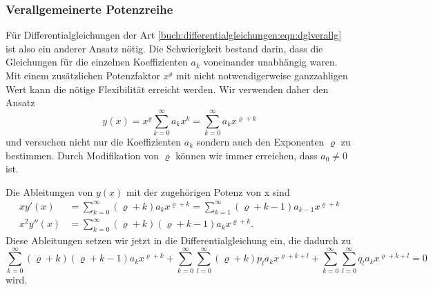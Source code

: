 \subsubsection{Verallgemeinerte Potenzreihe}
Für Differentialgleichungen der Art
\eqref{buch:differentialgleichungen:eqn:dglverallg}
ist also ein anderer Ansatz nötig.
Die Schwierigkeit bestand darin, dass die Gleichungen für die einzelnen
Koeffizienten $a_k$ voneinander unabhängig waren.
Mit einem zusätzlichen Potenzfaktor $x^\varrho$ mit nicht
notwendigerweise ganzzahligen Wert kann die nötige Flexibilität
erreicht werden.
Wir verwenden daher den Ansatz
\[
y(x)
=
x^\varrho \sum_{k=0}^\infty a_kx^k
=
\sum_{k=0}^\infty a_k x^{\varrho+k}
\]
und versuchen nicht nur die Koeffizienten $a_k$ sondern auch den
Exponenten $\varrho$ zu bestimmen.
Durch Modifikation von $\varrho$ können wir immer erreichen, dass
$a_0\ne 0$ ist.

Die Ableitungen von $y(x)$ mit der zugehörigen Potenz von x  sind
\begin{align*}
xy'(x)
&=
\sum_{k=0}^\infty
(\varrho+k)a_kx^{\varrho+k}
=
\sum_{k=1}^\infty
(\varrho+k-1)a_{k-1}x^{\varrho+k}
\\
x^2y''(x)
&=
\sum_{k=0}^\infty
(\varrho+k)(\varrho+k-1)a_kx^{\varrho+k}.
\end{align*}
Diese Ableitungen setzen wir jetzt in die Differentialgleichung ein, 
die dadurch zu
\begin{equation}
\sum_{k=0}^\infty  (\varrho+k)(\varrho+k-1) a_k x^{\varrho+k}
+
\sum_{k=0}^\infty \sum_{l=0}^\infty (\varrho+k) p_l a_kx^{\varrho+k+l}
+
\sum_{k=0}^\infty \sum_{l=0}^\infty q_l a_k x^{\varrho+k+l}
=
0
\label{buch:differentialgleichungen:eqn:veralgpotenzsumme}
\end{equation}
wird.

